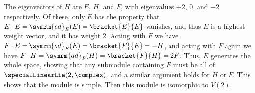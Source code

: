\documentclass[fleqn]{NotesClass}
\newcommand{\ad}{\symrm{ad}}
\begin{document}
    The eigenvectors of \(H\) are \(E\), \(H\), and \(F\), with eigenvalues \(+2\), \(0\), and \(-2\) respectively.
    Of these, only \(E\) has the property that \(E \cdot E = \ad_E(E) = \bracket{E}{E}\) vanishes, and thus \(E\) is a highest weight vector, and it has weight \(2\).
    Acting with \(F\) we have \(F \cdot E = \ad_F(E) = \bracket{F}{E} = -H\), and acting with \(F\) again we have \(F \cdot H = \ad_F(H) = \bracket{F}{H} = 2F\).
    Thus, \(E\) generates the whole space, showing that any submodule containing \(E\) must be all of \(\specialLinearLie(2, \complex)\), and a similar argument holds for \(H\) or \(F\).
    This shows that the module is simple.
    Then this module is isomorphic to \(V(2)\).
    
    
    
	
%	
	
\end{document}
